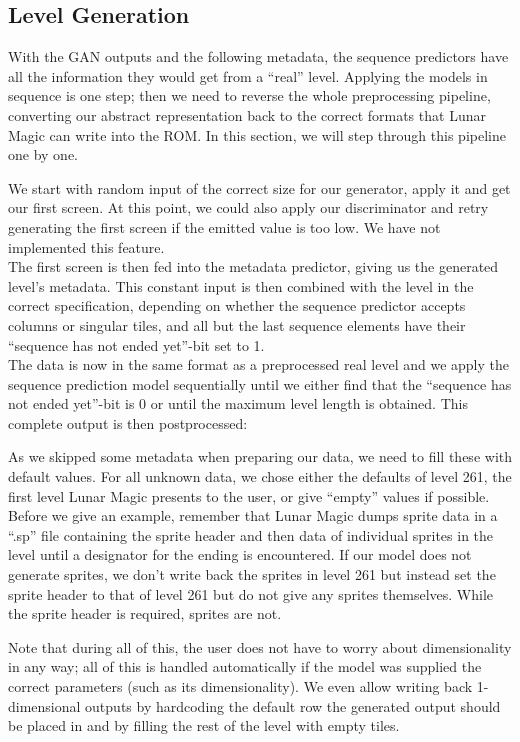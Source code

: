 \subsection{Level Generation}
\label{sec:level-generation}

With the GAN outputs and the following metadata, the sequence
predictors have all the information they would get from a ``real''
level. Applying the models in sequence is one step; then we need to
reverse the whole preprocessing pipeline, converting our abstract
representation back to the correct formats that Lunar Magic can write
into the ROM. In this section, we will step through this pipeline one
by one.

We start with random input of the correct size for our generator,
apply it and get our first screen. At this point, we could also apply
our discriminator and retry generating the first screen if the emitted
value is too low. We have not implemented this feature. \\
The first screen is then fed into the metadata predictor, giving us
the generated level's metadata. This constant input is then combined
with the level in the correct specification, depending on whether the
sequence predictor accepts columns or singular tiles, and all but the
last sequence elements have their ``sequence has not ended yet''-bit
set to 1. \\
The data is now in the same format as a preprocessed real level and we
apply the sequence prediction model sequentially until we either find
that the ``sequence has not ended yet''-bit is 0  or until the maximum
level length is obtained. This complete output is then postprocessed:

As we skipped some metadata when preparing our data, we need to fill
these with default values. For all unknown data, we chose either the
defaults of level 261, the first level Lunar Magic presents to the
user, or give ``empty'' values if possible. Before we give an example,
remember that Lunar Magic dumps sprite data in a ``.sp'' file
containing the sprite header and then data of individual sprites in
the level until a designator for the ending is encountered. If our
model does not generate sprites, we don't write back the sprites in
level 261 but instead set the sprite header to that of level 261 but
do not give any sprites themselves. While the sprite header is
required, sprites are not.

Note that during all of this, the user does not have to worry about
dimensionality in any way; all of this is handled automatically if the
model was supplied the correct parameters (such as its
dimensionality). We even allow writing back 1-dimensional outputs by
hardcoding the default row the generated output should be placed in
and by filling the rest of the level with empty tiles.



